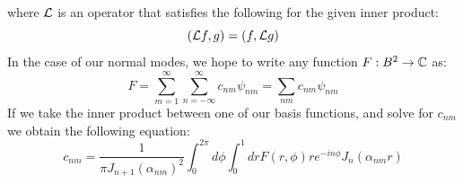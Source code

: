 \documentclass{article}
\begin{document}
where $\mathcal{L}$ is an operator that satisfies the following for the given inner product:
\begin{equation}\label{selfadjoint}
  (\mathcal{L} f,g) = (f,\mathcal{L} g)
\end{equation}
In the case of our normal modes, we hope to write any function $F:B^2\rightarrow\mathbb{C}$ as:
\begin{equation}
  \boxed{
    F = \sum_{m = 1}^\infty\sum_{n = -\infty}^\infty c_{nm} \psi_{nm} = \sum_{nm} c_{nm}\psi_{nm}
  }
\end{equation}
If we take the inner product between one of our basis functions, and solve for $c_{nm}$ we obtain the following equation:
\begin{equation}
  \boxed{
    c_{nm} = \frac{1}{\pi J_{n+1}(\alpha_{nm})^2}\int_0^{2\pi} d\phi\int_0^1 dr F(r,\phi) r e^{- i n \phi}J_n(\alpha_{nm} r)
  }
\end{equation}
\end{document}

